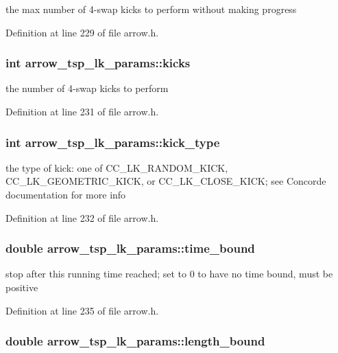 the max number of 4-swap kicks to perform without making progress 

Definition at line 229 of file arrow.h.\hypertarget{structarrow__tsp__lk__params_9744a2fb89bca6b678fec9a6a17255ea}{
\subsubsection{\setlength{\rightskip}{0pt plus 5cm}int {\bf arrow\_\-tsp\_\-lk\_\-params::kicks}}}
\label{structarrow__tsp__lk__params_9744a2fb89bca6b678fec9a6a17255ea}


the number of 4-swap kicks to perform 

Definition at line 231 of file arrow.h.\hypertarget{structarrow__tsp__lk__params_5b724dc268faa478b5b3e14c19abdc2a}{
\subsubsection{\setlength{\rightskip}{0pt plus 5cm}int {\bf arrow\_\-tsp\_\-lk\_\-params::kick\_\-type}}}
\label{structarrow__tsp__lk__params_5b724dc268faa478b5b3e14c19abdc2a}


the type of kick: one of CC\_\-LK\_\-RANDOM\_\-KICK, CC\_\-LK\_\-GEOMETRIC\_\-KICK, or CC\_\-LK\_\-CLOSE\_\-KICK; see Concorde documentation for more info 

Definition at line 232 of file arrow.h.\hypertarget{structarrow__tsp__lk__params_22355808165edb6033ca771b88917cf5}{
\subsubsection{\setlength{\rightskip}{0pt plus 5cm}double {\bf arrow\_\-tsp\_\-lk\_\-params::time\_\-bound}}}
\label{structarrow__tsp__lk__params_22355808165edb6033ca771b88917cf5}


stop after this running time reached; set to 0 to have no time bound, must be positive 

Definition at line 235 of file arrow.h.\hypertarget{structarrow__tsp__lk__params_36fb446a90e9b4c76702bd93f00357ea}{
\subsubsection{\setlength{\rightskip}{0pt plus 5cm}double {\bf arrow\_\-tsp\_\-lk\_\-params::length\_\-bound}}}
\label{structarrow__tsp__lk__params_36fb446a90e9b4c76702bd93f00357ea}


